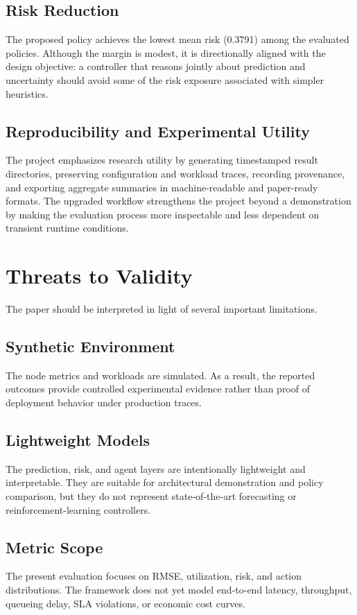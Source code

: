 \documentclass[conference]{IEEEtran}
\begin{document}
\subsection{Risk Reduction}
The proposed policy achieves the lowest mean risk (\num{0.3791}) among the evaluated policies. Although the margin is modest, it is directionally aligned with the design objective: a controller that reasons jointly about prediction and uncertainty should avoid some of the risk exposure associated with simpler heuristics.

\subsection{Reproducibility and Experimental Utility}
The project emphasizes research utility by generating timestamped result directories, preserving configuration and workload traces, recording provenance, and exporting aggregate summaries in machine-readable and paper-ready formats. The upgraded workflow strengthens the project beyond a demonstration by making the evaluation process more inspectable and less dependent on transient runtime conditions.

\section{Threats to Validity}
The paper should be interpreted in light of several important limitations.

\subsection{Synthetic Environment}
The node metrics and workloads are simulated. As a result, the reported outcomes provide controlled experimental evidence rather than proof of deployment behavior under production traces.

\subsection{Lightweight Models}
The prediction, risk, and agent layers are intentionally lightweight and interpretable. They are suitable for architectural demonstration and policy comparison, but they do not represent state-of-the-art forecasting or reinforcement-learning controllers.

\subsection{Metric Scope}
The present evaluation focuses on RMSE, utilization, risk, and action distributions. The framework does not yet model end-to-end latency, throughput, queueing delay, SLA violations, or economic cost curves.
\end{document}
